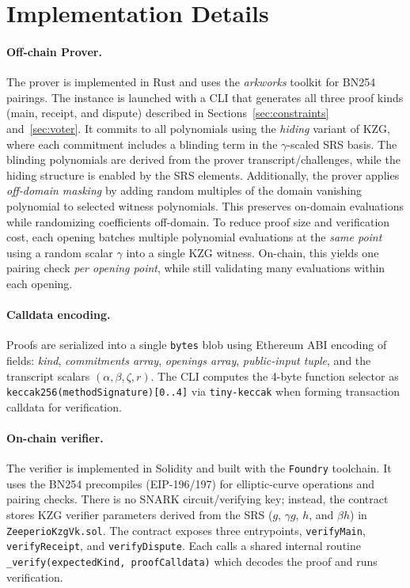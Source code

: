 \section{Implementation Details}
\label{app:implementation}

\paragraph{Off-chain Prover.}
The prover is implemented in Rust and uses the \emph{arkworks} toolkit for BN254 pairings. 
The instance is launched with a CLI that generates all three proof kinds (main, receipt, and dispute) described in Sections~\ref{sec:constraints} and~\ref{sec:voter}.
It commits to all polynomials using the \emph{hiding} variant of KZG, where each commitment includes a blinding term in the $\gamma$-scaled SRS basis.
The blinding polynomials are derived from the prover transcript/challenges, while the hiding structure is enabled by the SRS elements.
Additionally, the prover applies \emph{off-domain masking} by adding random multiples of the domain vanishing polynomial to selected witness polynomials.
This preserves on-domain evaluations while randomizing coefficients off-domain.
To reduce proof size and verification cost, each opening batches multiple polynomial evaluations at the \emph{same point}
using a random scalar $\gamma$ into a single KZG witness. On-chain, this yields one pairing check \emph{per opening point},
while still validating many evaluations within each opening.

\paragraph{Calldata encoding.}
Proofs are serialized into a single \texttt{bytes} blob using Ethereum ABI encoding of fields:
\emph{kind}, \emph{commitments array}, \emph{openings array}, \emph{public-input tuple}, and the transcript scalars $(\alpha,\beta,\zeta,r)$.
The CLI computes the 4-byte function selector as \texttt{keccak256(methodSignature)[0..4]} via \texttt{tiny-keccak} when forming transaction calldata for verification.

\paragraph{On-chain verifier.}
The verifier is implemented in Solidity and built with the \texttt{Foundry} toolchain.
It uses the BN254 precompiles (EIP-196/197) for elliptic-curve operations and pairing checks.
There is no SNARK circuit/verifying key; instead, the contract stores KZG verifier parameters derived from the SRS
($g$, $\gamma g$, $h$, and $\beta h$) in \texttt{ZeeperioKzgVk.sol}.
The contract exposes three entrypoints, \texttt{verifyMain}, \texttt{verifyReceipt}, and \texttt{verifyDispute}.
Each calls a shared internal routine \texttt{\_verify(expectedKind, proofCalldata)} which decodes the proof and runs verification.


